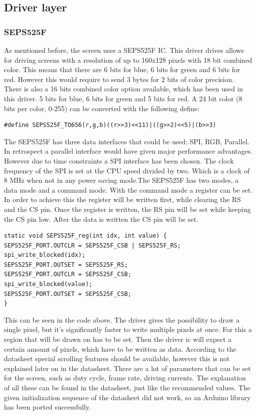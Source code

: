 \subsection{Driver layer}
\subsubsection{SEPS525F}
As mentioned before, the screen uses a SEPS525F IC. This driver drives allows for driving screens with a resolution of up to 160x128 pixels with 18 bit combined color. This means that there are 6 bits for blue, 6 bits for green and 6 bits for red. However this would require to send 3 bytes for 2 bits of color precision. There is also a 16 bits combined color option available, which has been used in this driver. 5 bits for blue, 6 bits for green and 5 bits for red. A 24 bit color (8 bits per color, 0-255) can be converted with the following define:
\begin{verbatim}
#define SEPS525F_TO656(r,g,b)((r>>3)<<11)|((g>>2)<<5)|(b>>3)
\end{verbatim} 
The SEPS525F has three data interfaces that could be used: SPI,
RGB, Parallel. In retrospect a parallel interface would have given major
performance advantages. However due to time constraints a SPI interface has been
chosen. The clock frequency of the SPI is set at the CPU speed divided by two.
Which is a clock of 8 MHz when not in any power saving mode.\newpar The SEPS525F
has two modes, a data mode and a command mode. With the command mode a register
can be set. In order to achieve this the register will be written first, while
clearing the RS and the CS pin. Once the register is written, the RS pin will be
set while keeping the CS pin low. After the data is written the CS pin will be
set.  
\begin{verbatim}
static void SEPS525F_reg(int idx, int value) {
SEPS525F_PORT.OUTCLR = SEPS525F_CSB | SEPS525F_RS;
spi_write_blocked(idx);
SEPS525F_PORT.OUTSET = SEPS525F_RS;
SEPS525F_PORT.OUTCLR = SEPS525F_CSB;
spi_write_blocked(value);
SEPS525F_PORT.OUTSET = SEPS525F_CSB;
}
\end{verbatim}
This can be seen in the code above. The driver gives the possibility to draw a single pixel, but it's significantly faster to write multiple pixels at once. For this a region that will be drawn on has to be set. Then the driver ic will expect a certain amount of pixels, which have to be written as data. According to the datasheet special scrolling features should be available, however this is not explained later on in the datasheet. There are a lot of parameters that can be set for the screen, such as duty cycle, frame rate, driving currents. The explanation of all these can be found in the datasheet, just like the recommended values. The given initialization sequence of the datasheet did not work, so an Arduino library has been ported successfully\cite{github:oled}.
